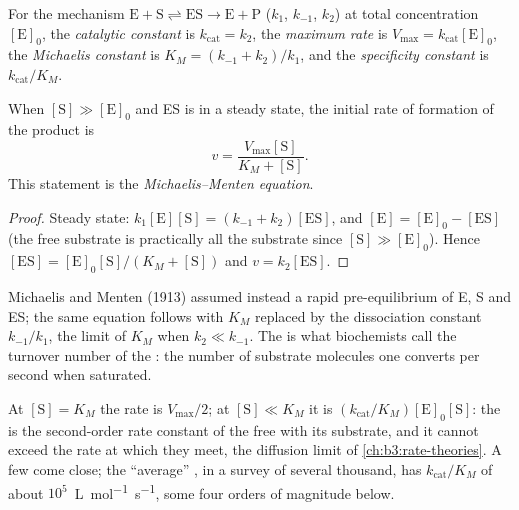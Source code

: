 \begin{definition}\label{def:b3:complex-kinetics:michaelis}
For the mechanism $\mathrm{E + S \rightleftharpoons ES \to E + P}$ ($k_1$, $k_{-1}$, $k_2$) at total  concentration
$[\mathrm E]_0$, the \emph{catalytic constant} is $k_{\mathrm{cat}} = k_2$, the
\emph{maximum rate} is $V_{\max} = k_{\mathrm{cat}}[\mathrm E]_0$, the \emph{Michaelis constant}
 is $K_M = (k_{-1} + k_2)/k_1$, and the \emph{specificity constant}
 is $k_{\mathrm{cat}}/K_M$.
\end{definition}

\begin{theorem}\label{thm:b3:complex-kinetics:michaelis-menten}
When $[\mathrm S] \gg [\mathrm E]_0$ and ES is in a steady state, the initial rate of formation of
the product is
\[
  v = \frac{V_{\max}[\mathrm S]}{K_M + [\mathrm S]} .
\]
This statement is the \emph{Michaelis--Menten equation}.
\end{theorem}

\begin{proof}
Steady state: $k_1[\mathrm E][\mathrm S] = (k_{-1} + k_2)[\mathrm{ES}]$, and $[\mathrm E] = [\mathrm E]_0 - [\mathrm{ES}]$ (the free
substrate is practically all the substrate since $[\mathrm S] \gg [\mathrm E]_0$). Hence $[\mathrm{ES}]
= [\mathrm E]_0[\mathrm S]/(K_M + [\mathrm S])$ and $v = k_2[\mathrm{ES}]$.
\end{proof}

\begin{remark}
Michaelis and Menten (1913) assumed instead a rapid pre-equilibrium of E, S and
ES; the same equation follows with $K_M$ replaced by the dissociation constant
$k_{-1}/k_1$, the limit of $K_M$ when $k_2 \ll k_{-1}$. The  is what
biochemists call the turnover number of the : the number of substrate
molecules one  converts per second when saturated.
\end{remark}

At $[\mathrm S] = K_M$ the rate is $V_{\max}/2$; at $[\mathrm S] \ll K_M$ it is $(k_{\mathrm{cat}}/K_M)[\mathrm E]_0[\mathrm S]$: the
 is the second-order rate constant of the free  with
its substrate, and it cannot exceed the rate at which they meet, the
diffusion limit of \cref{ch:b3:rate-theories}. A few  come close; the
``average'' , in a survey of several thousand, has $k_{\mathrm{cat}}/K_M$ of about
$10^5$~\unit{L.mol^{-1}.s^{-1}}, some four orders of magnitude below.

